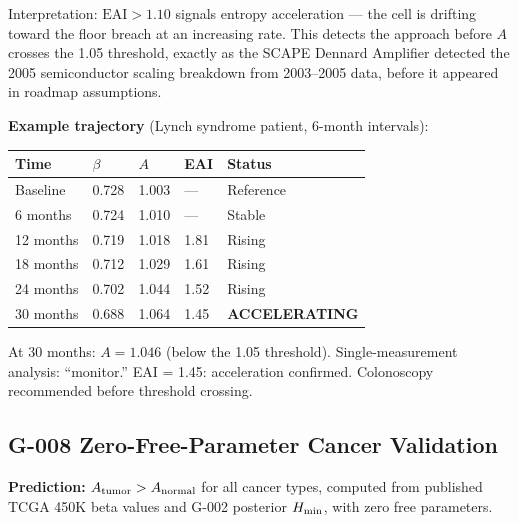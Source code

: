 \documentclass[12pt,a4paper]{article}
\begin{document}
\noindent Interpretation: $\text{EAI} > 1.10$ signals entropy acceleration ---
the cell is drifting toward the floor breach at an increasing rate.
This detects the approach before $A$ crosses the 1.05 threshold,
exactly as the SCAPE Dennard Amplifier detected the 2005 semiconductor
scaling breakdown from 2003--2005 data, before it appeared in roadmap assumptions.

\noindent \textbf{Example trajectory} (Lynch syndrome patient, 6-month intervals):

\begin{center}
\renewcommand{\arraystretch}{1.2}
\begin{tabular}{lllll}
\toprule
\textbf{Time} & $\beta$ & $A$ & EAI & Status \\
\midrule
Baseline  & 0.728 & 1.003 & ---    & Reference \\
6 months  & 0.724 & 1.010 & ---    & Stable \\
12 months & 0.719 & 1.018 & 1.81   & Rising \\
18 months & 0.712 & 1.029 & 1.61   & Rising \\
24 months & 0.702 & 1.044 & 1.52   & Rising \\
30 months & 0.688 & 1.064 & 1.45   & \textbf{ACCELERATING} \\
\bottomrule
\end{tabular}
\end{center}

At 30 months: $A = 1.046$ (below the 1.05 threshold).
Single-measurement analysis: ``monitor.''
EAI = 1.45: acceleration confirmed. Colonoscopy recommended before threshold crossing.

\subsection{G-008 Zero-Free-Parameter Cancer Validation}
\label{subsec:g008}

\textbf{Prediction:} $A_{\rm tumor} > A_{\rm normal}$ for all cancer types,
computed from published TCGA 450K beta values and G-002 posterior $H_{\rm min}$,
with zero free parameters.
\end{document}
